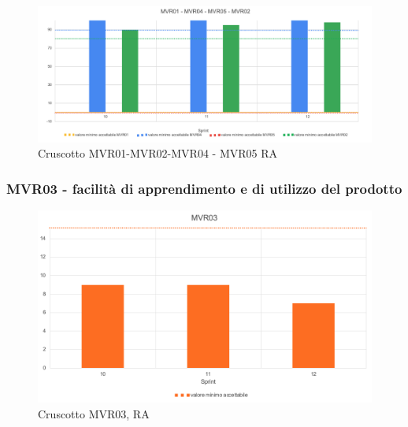 \begin{figure}[H] 
    \centering
    \includegraphics[scale = 0.5]{immagini/ImmRA/Mvr01020405.png}
    \caption{Cruscotto MVR01-MVR02-MVR04 - MVR05 RA}
\end{figure}

\subsubsection*{MVR03 - facilità di apprendimento e di utilizzo del prodotto}

\begin{figure}[H] 
    \centering
    \includegraphics[scale = 0.7]{immagini/ImmRA/MVR03.png}
    \caption{Cruscotto MVR03, RA}
\end{figure}
